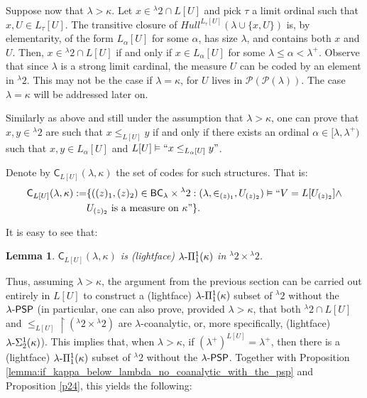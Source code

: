 \documentclass{amsart}
\numberwithin{equation}{section}
\def\hyp{{\hbox{-}}}
\newtheorem{lemma}[theorem]{Lemma}
\theoremstyle{definition}
\theoremstyle{remark}
\begin{document}
Suppose now that $\lambda>\kappa$. Let $x\in{}^{\lambda}2\cap L[U]$ and pick $\tau$ a limit ordinal such that $x,U\in L_\tau[U]$. The transitive closure of $Hull^{L_{\tau}[U]}(\lambda\cup\{x,U\})$ is, by elementarity, of the form $L_\alpha[U]$ for some $\alpha$, has size $\lambda$, and contains both $x$ and $U$. Then, $x\in{}^{\lambda}2\cap L[U]$ if and only if $x\in L_\alpha[U]$ for some $\lambda\leq\alpha<\lambda^+$. Observe that since $\lambda$ is a strong limit cardinal, the measure $U$ can be coded by an element in ${}^{\lambda}2$. This may not be the case if $\lambda=\kappa$, for $U$ lives in $\mathcal{P}(\mathcal{P}(\lambda))$. The case  $\lambda=\kappa$ will be addressed later on. 

Similarly as above and still under the assumption that $\lambda>\kappa$, one can prove that $x,y\in{}^{\lambda}2$ are such that $x\leq_{L[U]}y$ if and only if there exists an ordinal $\alpha\in[\lambda,\lambda^+)$ such that $x,y\in L_\alpha[U]$ and $L[U]\vDash ``x\leq_{L_\alpha[U]}y"$.



Denote by $\mathsf{C}_{L[U]}(\lambda,\kappa)$ the set of codes for such structures. That is:
\begin{equation*}
	\begin{split}
		\mathsf{C}_{L[U]}(\lambda,\kappa):=&\{((z)_1,(z)_2)\in\mathsf{BC}_{\lambda}\times{}^{\lambda}2: (\lambda,\in_{(z)_1},U_{(z)_2})\vDash``V=L[U_{(z)_2}]\wedge\\ & U_{(z)_2}\text{ is a measure on }\kappa"\}.
	\end{split}
\end{equation*}

It is easy to see that:

\begin{lemma} $\mathsf{C}_{L[U]}(\lambda,\kappa)$ is \emph{(lightface)} $\lambda\hyp\Pi^1_1(\kappa)$ in ${}^\lambda 2\times{}^\lambda 2$. 
\end{lemma}



Thus, assuming $\lambda>\kappa$, the argument from the previous section can be carried out entirely in $L[U]$ to construct a (lightface) $\lambda\hyp\Pi^1_1(\kappa)$ subset of ${}^{\lambda}2$ without the $\lambda\hyp\mathsf{PSP}$ (in particular, one can also prove, provided $\lambda>\kappa$, that both ${}^{\lambda}2\cap L[U]$ and $\leq_{L[U]}\upharpoonright({}^{\lambda}2\times{}^{\lambda}2)$ are $\lambda$-coanalytic, or, more specifically, (lightface) $\lambda\hyp\Sigma^1_2(\kappa)$). This implies that, when $\lambda>\kappa$, if $(\lambda^+)^{L[U]}=\lambda^+$, then there is a (lightface) $\lambda\hyp\Pi^1_1(\kappa)$ subset of ${}^{\lambda}2$ without the $\lambda\hyp\mathsf{PSP}$. Together with Proposition \ref{lemma:if_kappa_below_lambda_no_coanalytic_with_the_psp} and Proposition \ref{p24}, this yields the following:
\end{document}
